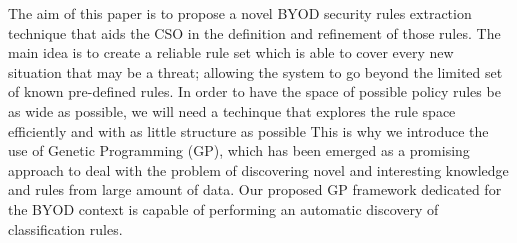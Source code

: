 \documentclass[a4paper,10pt,twocolumn,preprint,3p]{elsarticle}
\begin{document}
The aim of this paper is to propose a novel  BYOD security rules extraction technique that aids the CSO in the definition and refinement of those rules. %
The main idea is to create a reliable rule set
which is able to cover every new situation that may be a threat;
allowing the system to go beyond the limited set of known pre-defined
rules. In order to have the space of possible policy rules be as wide as possible, we will need a techinque that explores the rule space efficiently and with as little structure as possible
 This is why we introduce the use of Genetic Programming (GP), which
has been emerged as a promising approach to deal with the problem of
discovering novel and interesting knowledge and rules from large
amount of data. Our proposed GP framework dedicated
for the BYOD context is capable of performing an automatic discovery
of classification rules.

\end{document}
